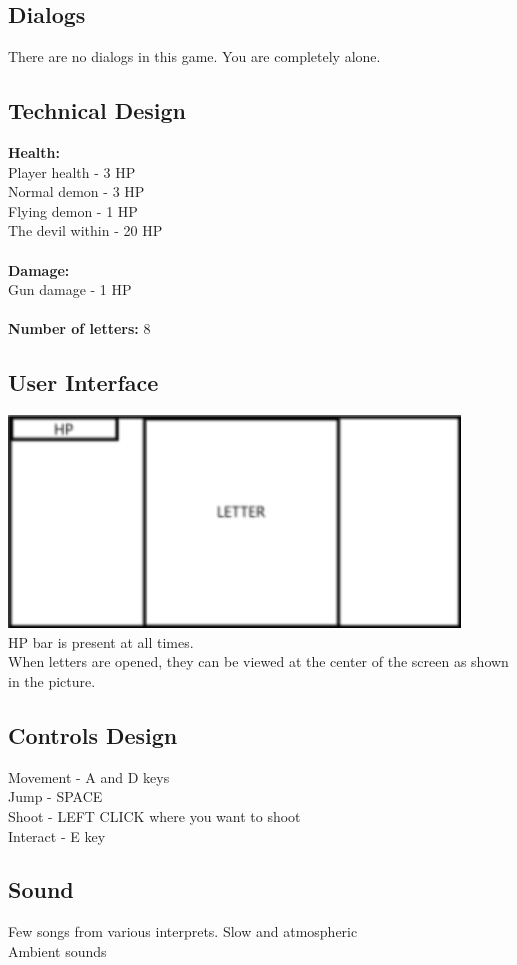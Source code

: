 \documentclass{article}
\begin{document}
\subsection{Dialogs}
There are no dialogs in this game. You are completely alone.
\subsection{Technical Design}
\textbf{Health:}\\
Player health - 3 HP\\
Normal demon - 3 HP\\
Flying demon - 1 HP\\
The devil within - 20 HP\\
\\
\textbf{Damage:}\\
Gun damage - 1 HP\\
\\
\textbf{Number of letters:} 8

\subsection{User Interface}
\includegraphics{HUD}\\
HP bar is present at all times.\\
When letters are opened, they can be viewed at the center of the screen as shown in the picture.
\subsection{Controls Design}
Movement - A and D keys\\
Jump - SPACE\\
Shoot - LEFT CLICK where you want to shoot\\
Interact - E key
\subsection{Sound}
Few songs from various interprets. Slow and atmospheric\\
Ambient sounds
\end{document}
